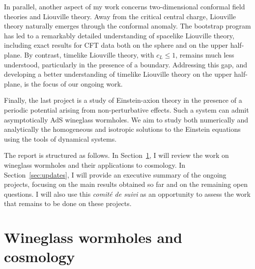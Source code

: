 \documentclass[a4paper]{article}
\begin{document}
In parallel, another aspect of my work concerns two-dimensional conformal field theories and Liouville theory. Away from the critical central charge, Liouville theory naturally emerges through the conformal anomaly. The bootstrap program has led to a remarkably detailed understanding of spacelike Liouville theory, including exact results for CFT data both on the sphere and on the upper half-plane. By contrast, timelike Liouville theory, with $c_L \leq 1$, remains much less understood, particularly in the presence of a boundary. Addressing this gap, and developing a better understanding of timelike Liouville theory on the upper half-plane, is the focus of our ongoing work.

Finally, the last project is a study of Einstein-axion theory in the presence of a periodic potential arising from non-perturbative effects. Such a system can admit asymptotically AdS wineglass wormholes. We aim to study both numerically and analytically the homogeneous and isotropic solutions to the Einstein equations using the tools of dynamical systems.

The report is structured as follows. In Section~\ref{sec:wineglass}, I will review the work on wineglass wormholes and their applications to cosmology. In Section~\ref{sec:updates}, I will provide an executive summary of the ongoing projects, focusing on the main results obtained so far and on the remaining open questions. I will also use this \textit{comité de suivi} as an opportunity to assess the work that remains to be done on these projects.

\section{Wineglass wormholes and cosmology}\label{sec:wineglass}
\end{document}
